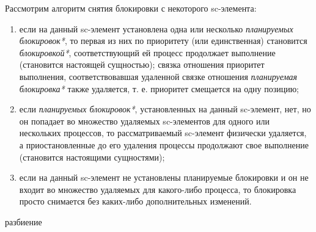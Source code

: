 Рассмотрим алгоритм снятия блокировки с некоторого sc-элемента:
\begin{enumerate}
	\item если на данный sc-элемент установлена одна или несколько \textit{планируемых блокировок*}, то первая из них по приоритету (или единственная) становится \textit{блокировкой*}, соответствующий ей процесс продолжает выполнение (становится настоящей сущностью); связка отношения приоритет выполнения, соответствовавшая удаленной связке отношения \textit{планируемая блокировка*} также удаляется, т. е. приоритет смещается на одну позицию;
	\item если \textit{планируемых блокировок*}, установленных на данный sc-элемент, нет, но он попадает во множество удаляемых sc-элементов для одного или нескольких процессов, то рассматриваемый sc-элемент физически удаляется, а приостановленные до его удаления процессы продолжают свое выполнение (становится настоящими сущностями);
	\item если на данный sc-элемент не установлены планируемые блокировки и он не входит во множество удаляемых для какого-либо процесса, то блокировка просто снимается без каких-либо дополнительных изменений.
\end{enumerate}

\begin{SCn}
\begin{scnrelfromset}{разбиение}
\end{scnrelfromset}
\end{SCn}

